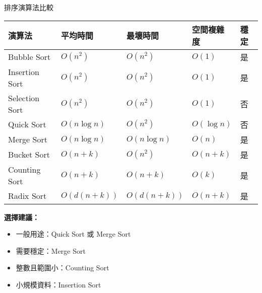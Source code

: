 \documentclass{beamer}
\begin{document}
\begin{frame}{排序演算法比較}
\begin{center}
\renewcommand{\arraystretch}{1.2}
\scriptsize
\begin{tabular}{|>{\centering\arraybackslash}m{1.8cm}|>{\centering\arraybackslash}m{1.5cm}|>{\centering\arraybackslash}m{1.5cm}|>{\centering\arraybackslash}m{1.2cm}|>{\centering\arraybackslash}m{1cm}|}
\hline
\textbf{演算法} & \textbf{平均時間} & \textbf{最壞時間} & \textbf{空間複雜度} & \textbf{穩定} \\
\hline
Bubble Sort & $O(n^2)$ & $O(n^2)$ & $O(1)$ & 是 \\
\hline
Insertion Sort & $O(n^2)$ & $O(n^2)$ & $O(1)$ & 是 \\
\hline
Selection Sort & $O(n^2)$ & $O(n^2)$ & $O(1)$ & 否 \\
\hline
Quick Sort & $O(n \log n)$ & $O(n^2)$ & $O(\log n)$ & 否 \\
\hline
Merge Sort & $O(n \log n)$ & $O(n \log n)$ & $O(n)$ & 是 \\
\hline
Bucket Sort & $O(n+k)$ & $O(n^2)$ & $O(n+k)$ & 是 \\
\hline
Counting Sort & $O(n+k)$ & $O(n+k)$ & $O(k)$ & 是 \\
\hline
Radix Sort & $O(d(n+k))$ & $O(d(n+k))$ & $O(n+k)$ & 是 \\
\hline
\end{tabular}
\end{center}

\vspace{1em}
\textbf{選擇建議：}
\begin{itemize}
    \item 一般用途：Quick Sort 或 Merge Sort
    \item 需要穩定：Merge Sort
    \item 整數且範圍小：Counting Sort
    \item 小規模資料：Insertion Sort
\end{itemize}
\end{frame}
\end{document}

